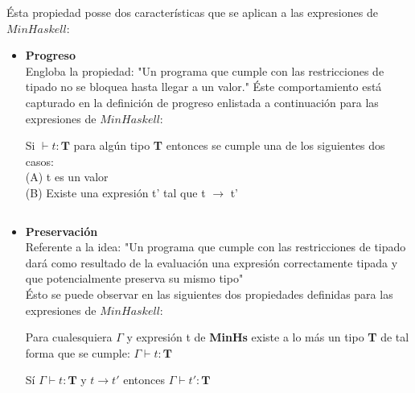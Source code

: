         Ésta propiedad posse dos características que se aplican a las expresiones de $MinHaskell$:
        \begin{itemize}
            \item \textbf{Progreso} \\
            Engloba la propiedad: "Un programa que cumple con las restricciones de tipado no se bloquea hasta llegar a un valor." Éste comportamiento está capturado en la definición de progreso enlistada a continuación para las expresiones de $MinHaskell$:\\
             
             \begin{definition}
                Si $\vdash t : \textbf{T}$ para algún tipo \textbf{T} entonces se cumple una de los siguientes dos casos:\\
                (A) t es un valor \\
                (B) Existe una expresión t' tal que t $\to$ t'
             \end{definition}
                $$$$
            \item \textbf{Preservación} \\
                Referente a la idea: "Un programa que cumple con las restricciones de tipado dará como resultado de la evaluación una expresión correctamente tipada y que potencialmente preserva su mismo tipo"\\
        
                Ésto se puede observar en las siguientes dos propiedades definidas para las expresiones de $MinHaskell$:\\
                

                    \begin{definition}
                        Para cualesquiera $\Gamma$ y expresión t de \textbf{MinHs} existe a lo más un tipo \textbf{T} de tal forma que se cumple: $\Gamma \vdash t : \textbf{T}$\\    
                    \end{definition}
                    
                     \begin{definition}
                        Sí $\Gamma \vdash t : \textbf{T}$ y $t \to t'$ entonces $\Gamma \vdash t' : \textbf{T}$
                    \end{definition}

        \end{itemize}

